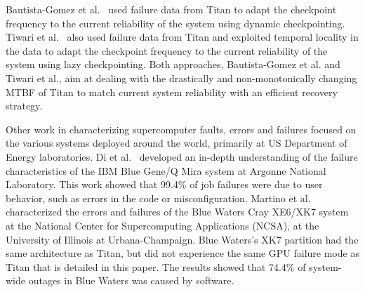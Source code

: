 Bautista-Gomez et al.~\cite{bautista-gomez16reducing} used failure data from Titan to adapt the checkpoint frequency to the current reliability of the system using dynamic checkpointing.
%
Tiwari et al.~\cite{6903564} also used failure data from Titan and exploited temporal locality in the data to adapt the checkpoint frequency to the current reliability of the system using lazy checkpointing.
%
Both approaches, Bautista-Gomez et al. and Tiwari et al., aim at dealing with the drastically and non-monotonically changing MTBF of Titan to match current system reliability with an efficient recovery strategy.

Other work in characterizing supercomputer faults, errors and failures focused on the various systems deployed around the world, primarily at US Department of Energy laboratories.
%
Di et al.~\cite{8809553} developed an in-depth understanding of the failure characteristics of the IBM Blue Gene/Q Mira system at Argonne National Laboratory. This work showed that 99.4\% of job failures were due to user behavior, such as errors in the code or misconfiguration. Martino et al.~\cite{6903615} characterized the errors and failures of the Blue Waters Cray XE6/XK7 system at the National Center for Supercomputing Applications (NCSA), at the University of Illinois at Urbana-Champaign. Blue Waters's XK7 partition had the same architecture as Titan, but did not experience the same GPU failure mode as Titan that is detailed in this paper. The results showed that 74.4\% of system-wide outages in Blue Waters was caused by software.


